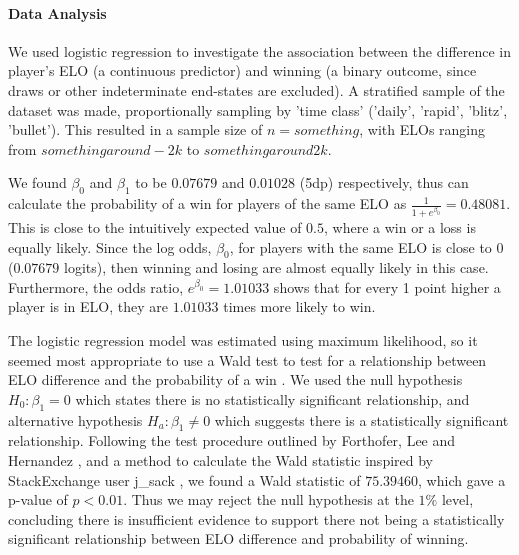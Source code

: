 \documentclass[10pt,a4paper,twocolumn]{article}
\begin{document}

\paragraph{Data Analysis}
We used logistic regression to investigate the association between the difference in player's ELO (a continuous predictor) and winning (a binary outcome, since draws or other indeterminate end-states are excluded).
A stratified sample of the dataset was made, proportionally sampling by 'time class' ('daily', 'rapid', 'blitz', 'bullet'). This resulted in a sample size of $n={something}$, with ELOs ranging from ${something around -2k}$ to ${something around 2k}$.

We found $\beta_{0}$ and $\beta_{1}$ to be $0.07679$ and $0.01028$ (5dp) respectively, thus can calculate the probability of a win for players of the same ELO as $\displaystyle\frac{1}{1+e^{\beta_{0}}} = 0.48081$. This is close to the intuitively expected value of $0.5$, where a win or a loss is equally likely. Since the log odds, $\beta_{0}$, for players with the same ELO is close to $0$ ($0.07679$ logits), then winning and losing are almost equally likely in this case. Furthermore, the odds ratio, $e^{\beta_{0}} = 1.01033$ shows that for every 1 point higher a player is in ELO, they are $1.01033$ times more likely to win.

The logistic regression model was estimated using maximum likelihood, so it seemed most appropriate to use a Wald test to test for a relationship between ELO difference and the probability of a win \cite{WaldTest}. We used the null hypothesis $H_{0}: \beta_{1} = 0$ which states there is no statistically significant relationship, and alternative hypothesis $H_{a}: \beta_{1} \neq 0$ which suggests there is a statistically significant relationship. Following the test procedure outlined by Forthofer, Lee and Hernandez \cite{WaldTest}, and a method to calculate the Wald statistic inspired by StackExchange user j\_sack \cite{StackExchangeWaldTest}, we found a Wald statistic of $75.39460$, which gave a p-value of $p<0.01$. Thus we may reject the null hypothesis at the $1\%$ level, concluding there is insufficient evidence to support there not being a statistically significant relationship between ELO difference and probability of winning.
\end{document}
